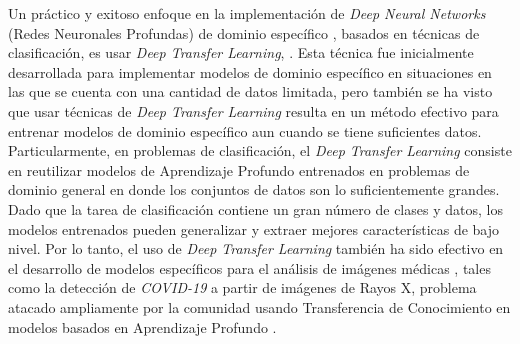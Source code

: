 Un práctico y exitoso enfoque en la implementación de \textit{Deep Neural Networks} (Redes Neuronales
Profundas) de dominio
específico \cite{liu2017survey}, basados en técnicas de clasificación, es usar \textit{Deep Transfer Learning},
\cite{long2016unsupervised,oquab2014learning,tan2018survey}.
Esta técnica fue inicialmente desarrollada para implementar modelos de dominio específico en
situaciones en las que se cuenta con una cantidad de datos limitada, pero también se ha visto que
usar técnicas de \textit{Deep Transfer Learning} resulta en un método efectivo para entrenar modelos
de dominio específico aun cuando se tiene suficientes datos. Particularmente, en problemas de
clasificación, el \textit{Deep Transfer Learning} consiste en reutilizar modelos de Aprendizaje Profundo entrenados en problemas de
dominio general en donde los conjuntos de datos son lo suficientemente grandes. Dado que la tarea de
clasificación contiene un gran número de clases y datos, los modelos entrenados pueden generalizar y
extraer mejores características de bajo nivel. Por lo tanto, el uso de \textit{Deep Transfer Learning}
también ha sido efectivo en el desarrollo de modelos específicos para el análisis de imágenes médicas
\cite{deniz2018transfer,litjens2017survey,sufian2020survey}, tales como la detección de
\textit{COVID-19} a partir de imágenes de Rayos X, problema atacado ampliamente por la comunidad
usando Transferencia de Conocimiento en modelos basados en Aprendizaje Profundo
\cite{agrawal2021focuscovid,ai2020correlation,sufian2020survey}.


